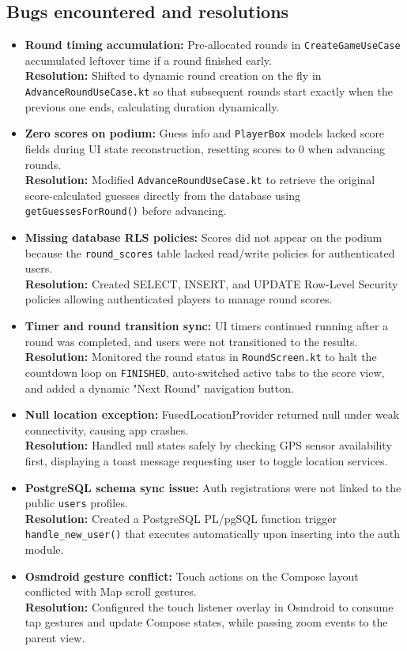 \documentclass[11pt,a4paper]{article}
\begin{document}
\subsection{Bugs encountered and resolutions}
\begin{itemize}
    \item \textbf{Round timing accumulation:} Pre-allocated rounds in \texttt{CreateGameUseCase} accumulated leftover time if a round finished early. \\
    \textbf{Resolution:} Shifted to dynamic round creation on the fly in \texttt{AdvanceRoundUseCase.kt} so that subsequent rounds start exactly when the previous one ends, calculating duration dynamically.
    \item \textbf{Zero scores on podium:} Guess info and \texttt{PlayerBox} models lacked score fields during UI state reconstruction, resetting scores to 0 when advancing rounds. \\
    \textbf{Resolution:} Modified \texttt{AdvanceRoundUseCase.kt} to retrieve the original score-calculated guesses directly from the database using \texttt{getGuessesForRound()} before advancing.
    \item \textbf{Missing database RLS policies:} Scores did not appear on the podium because the \texttt{round\_scores} table lacked read/write policies for authenticated users. \\
    \textbf{Resolution:} Created SELECT, INSERT, and UPDATE Row-Level Security policies allowing authenticated players to manage round scores.
    \item \textbf{Timer and round transition sync:} UI timers continued running after a round was completed, and users were not transitioned to the results. \\
    \textbf{Resolution:} Monitored the round status in \texttt{RoundScreen.kt} to halt the countdown loop on \texttt{FINISHED}, auto-switched active tabs to the score view, and added a dynamic "Next Round" navigation button.
    \item \textbf{Null location exception:} FusedLocationProvider returned null under weak connectivity, causing app crashes. \\
    \textbf{Resolution:} Handled null states safely by checking GPS sensor availability first, displaying a toast message requesting user to toggle location services.
    \item \textbf{PostgreSQL schema sync issue:} Auth registrations were not linked to the public \texttt{users} profiles. \\
    \textbf{Resolution:} Created a PostgreSQL PL/pgSQL function trigger \texttt{handle\_new\_user()} that executes automatically upon inserting into the auth module.
    \item \textbf{Osmdroid gesture conflict:} Touch actions on the Compose layout conflicted with Map scroll gestures. \\
    \textbf{Resolution:} Configured the touch listener overlay in Osmdroid to consume tap gestures and update Compose states, while passing zoom events to the parent view.
\end{itemize}
\end{document}
